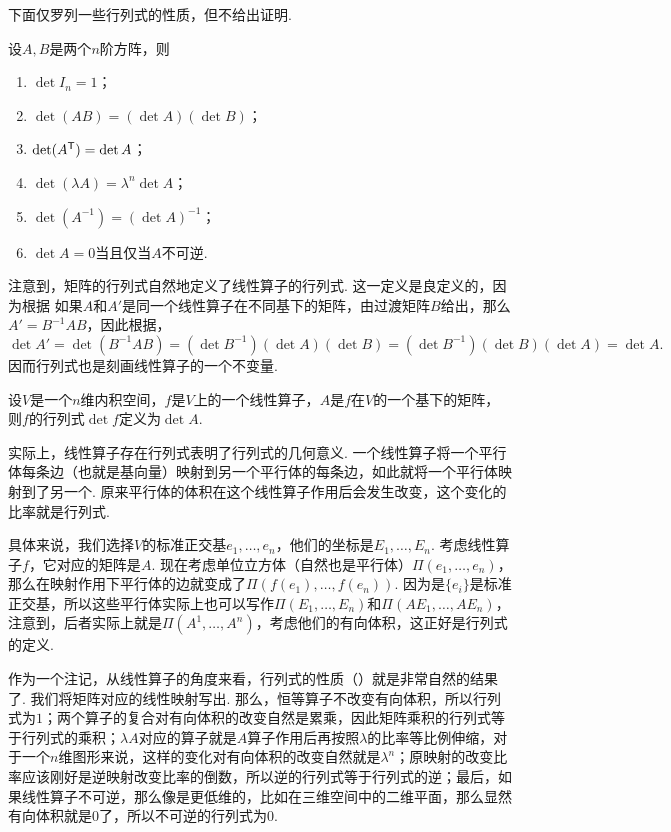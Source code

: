 下面仅罗列一些行列式的性质，但不给出证明. 

\begin{proposition}\label{prop:determinant}
    设$A,B$是两个$n$阶方阵，则
    \begin{enumerate}
        \item $\det I_n=1$；
        \item $\det(AB)=(\det A)(\det B)$；
        \item $\det(A^{\mathsf{T}})=\det A$；
        \item $\det(\lambda A)=\lambda^n\det A$；
        \item $\det(A^{-1})=(\det A)^{-1}$；
        \item $\det A=0$当且仅当$A$不可逆. 
    \end{enumerate}
\end{proposition}

注意到，矩阵的行列式自然地定义了线性算子的行列式. 这一定义是良定义的，因为根据 如果$A$和$A'$是同一个线性算子在不同基下的矩阵，由过渡矩阵$B$给出，那么$A'=B^{-1}AB$，因此根据，
\[\det A'=\det(B^{-1}AB)=(\det B^{-1})(\det A)(\det B)=(\det B^{-1})(\det B)(\det A)=\det A.\]
因而行列式也是刻画线性算子的一个不变量. 

\begin{definition}[线性算子的行列式]
设$V$是一个$n$维内积空间，$f$是$V$上的一个线性算子，$A$是$f$在$V$的一个基下的矩阵，则$f$的行列式$\det f$定义为$\det A$.
\end{definition}

实际上，线性算子存在行列式表明了行列式的几何意义. 一个线性算子将一个平行体每条边（也就是基向量）映射到另一个平行体的每条边，如此就将一个平行体映射到了另一个. 原来平行体的体积在这个线性算子作用后会发生改变，这个变化的比率就是行列式. 

具体来说，我们选择$V$的标准正交基$e_1,\dots,e_n$，他们的坐标是$E_1,\dots,E_n$. 考虑线性算子$f$，它对应的矩阵是$A$. 现在考虑单位立方体（自然也是平行体）$\Pi(e_1,\dots,e_n)$，那么在映射作用下平行体的边就变成了$\Pi(f(e_1),\dots,f(e_n))$. 因为是$\{e_i\}$是标准正交基，所以这些平行体实际上也可以写作$\Pi(E_1,\dots,E_n)$和$\Pi(AE_1,\dots,AE_n)$，注意到，后者实际上就是$\Pi(A^1,\dots, A^n)$，考虑他们的有向体积，这正好是行列式的定义. 

作为一个注记，从线性算子的角度来看，行列式的性质（）就是非常自然的结果了. 我们将矩阵对应的线性映射写出. 那么，恒等算子不改变有向体积，所以行列式为$1$；两个算子的复合对有向体积的改变自然是累乘，因此矩阵乘积的行列式等于行列式的乘积；$\lambda A$对应的算子就是$A$算子作用后再按照$\lambda$的比率等比例伸缩，对于一个$n$维图形来说，这样的变化对有向体积的改变自然就是$\lambda^n$；原映射的改变比率应该刚好是逆映射改变比率的倒数，所以逆的行列式等于行列式的逆；最后，如果线性算子不可逆，那么像是更低维的，比如在三维空间中的二维平面，那么显然有向体积就是$0$了，所以不可逆的行列式为$0$.


